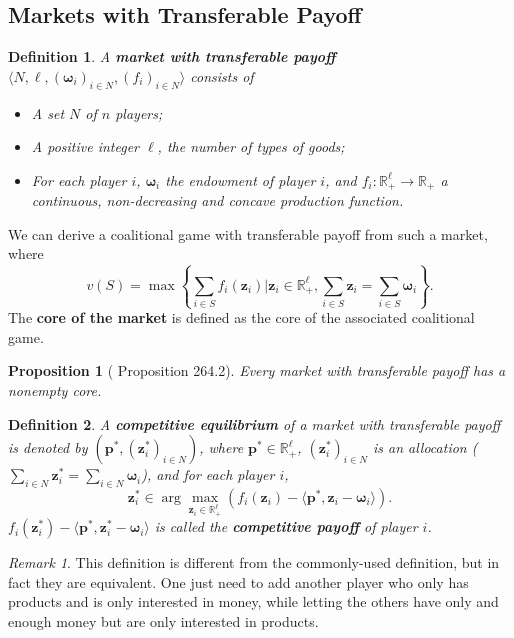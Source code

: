 \documentclass[openany]{book}
\newtheorem{definition}{Definition}[chapter]
\newtheorem{proposition}{Proposition}[chapter]
\theoremstyle{remark}
\newtheorem*{remark}{Remark}
\begin{document}
\subsection{Markets with Transferable Payoff}
\begin{definition}
    A \textbf{market with transferable payoff} $\langle N,\ell,(\boldsymbol{\omega}_i)_{i\in N},(f_i)_{i\in N}\rangle$ consists of
    \begin{itemize}
        \item A set $N$ of $n$ players;
        \item A positive integer $\ell$, the number of types of goods;
        \item For each player $i$, $\boldsymbol{\omega}_i$ the endowment of player $i$, and $f_i:\mathbb{R}_+^{\ell}\to \mathbb{R}_+$ a continuous, non-decreasing and concave production function.
    \end{itemize}
\end{definition}
We can derive a coalitional game with transferable payoff from such a market, where
\begin{equation}
    v(S)=\max\left\{\sum_{i\in S}^{}f_i(\boldsymbol{z}_i)|\boldsymbol{z}_i\in \mathbb{R}_+^{\ell},\sum_{i\in S}^{}\boldsymbol{z}_i=\sum_{i\in S}^{}\boldsymbol{\omega}_i\right\}.
\end{equation}
The \textbf{core of the market} is defined as the core of the associated coalitional game.
\begin{proposition}[\cite{OR94} Proposition 264.2]
    Every market with transferable payoff has a nonempty core.
\end{proposition}
\begin{definition}\label{CENoBudget}
    A \textbf{competitive equilibrium} of a market with transferable payoff is denoted by $(\boldsymbol{p}^*,(\boldsymbol{z}_i^*)_{i\in N})$, where $\boldsymbol{p}^*\in \mathbb{R}_+^{\ell}$, $(\boldsymbol{z}_i^*)_{i\in N}$ is an allocation ($\sum_{i\in N}^{}\boldsymbol{z}_i^*=\sum_{i\in N}^{}\boldsymbol{\omega}_i$), and for each player $i$,
    \begin{equation}
        \boldsymbol{z}_i^*\in\arg\max_{\boldsymbol{z}_i\in \mathbb{R}_+^{\ell}}(f_i(\boldsymbol{z}_i)-\langle \boldsymbol{p}^*,\boldsymbol{z}_i-\boldsymbol{\omega}_i\rangle).
    \end{equation}
    $f_i(\boldsymbol{z}_i^*)-\langle \boldsymbol{p}^*,\boldsymbol{z}_i^*-\boldsymbol{\omega}_i\rangle$ is called the \textbf{competitive payoff} of player $i$.
\end{definition}
\begin{remark}
    This definition is different from the commonly-used definition, but in fact they are equivalent. One just need to add another player who only has products and is only interested in money, while letting the others have only and enough money but are only interested in products.
\end{remark}
\end{document}
